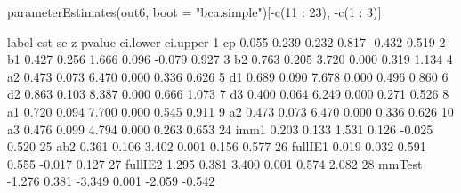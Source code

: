 \begin{Schunk}
\begin{Sinput}
 parameterEstimates(out6, 
                    boot = "bca.simple")[-c(11 : 23), -c(1 : 3)]
\end{Sinput}
\begin{Soutput}
     label    est    se      z pvalue ci.lower ci.upper
1       cp  0.055 0.239  0.232  0.817   -0.432    0.519
2       b1  0.427 0.256  1.666  0.096   -0.079    0.927
3       b2  0.763 0.205  3.720  0.000    0.319    1.134
4       a2  0.473 0.073  6.470  0.000    0.336    0.626
5       d1  0.689 0.090  7.678  0.000    0.496    0.860
6       d2  0.863 0.103  8.387  0.000    0.666    1.073
7       d3  0.400 0.064  6.249  0.000    0.271    0.526
8       a1  0.720 0.094  7.700  0.000    0.545    0.911
9       a2  0.473 0.073  6.470  0.000    0.336    0.626
10      a3  0.476 0.099  4.794  0.000    0.263    0.653
24    imm1  0.203 0.133  1.531  0.126   -0.025    0.520
25     ab2  0.361 0.106  3.402  0.001    0.156    0.577
26 fullIE1  0.019 0.032  0.591  0.555   -0.017    0.127
27 fullIE2  1.295 0.381  3.400  0.001    0.574    2.082
28  mmTest -1.276 0.381 -3.349  0.001   -2.059   -0.542
\end{Soutput}
\end{Schunk}
